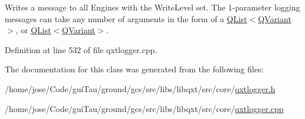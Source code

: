 Writes a message to all Engines with the Write\-Level set. The 1-\/parameter logging messages can take any number of arguments in the form of a \hyperlink{class_q_list}{Q\-List$<$\-Q\-Variant$>$}, or \hyperlink{class_q_list}{Q\-List$<$\-Q\-Variant$>$}. 



Definition at line 532 of file qxtlogger.\-cpp.



The documentation for this class was generated from the following files\-:\begin{DoxyCompactItemize}
\item 
/home/jose/\-Code/gui\-Tau/ground/gcs/src/libs/libqxt/src/core/\hyperlink{qxtlogger_8h}{qxtlogger.\-h}\item 
/home/jose/\-Code/gui\-Tau/ground/gcs/src/libs/libqxt/src/core/\hyperlink{qxtlogger_8cpp}{qxtlogger.\-cpp}\end{DoxyCompactItemize}
